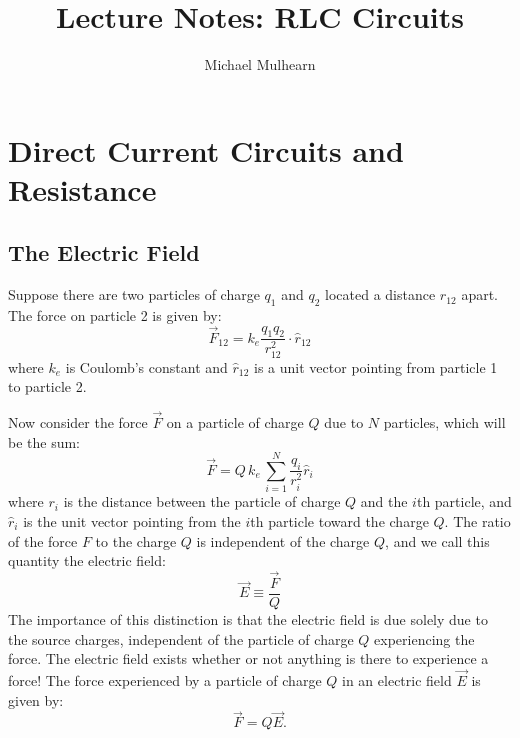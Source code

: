\documentclass[12pt,oneside]{book}
\begin{document}

\title{Lecture Notes:  RLC Circuits}
\author{Michael Mulhearn}

\maketitle

\chapter{Direct Current Circuits and Resistance}

\section{The Electric Field}

Suppose there are two particles of charge $q_1$ and $q_2$ located a distance $r_{12}$ apart.
The force on particle 2 is given by:
\begin{displaymath}
\vec{F}_{12} = k_e \frac{q_1 q_2}{r_{12}^2} \cdot \hat{r}_{12}
\end{displaymath}
where $k_e$ is Coulomb's constant and $\hat{r}_{12}$ is a unit vector pointing from particle 1 to particle 2.

Now consider the force $\vec{F}$ on a particle of charge $Q$ due to $N$ particles, which will be the sum:
\begin{displaymath}
\vec{F} = Q \, k_e \, \sum_{i=1}^N \frac{q_i}{r_{i}^2} \hat{r}_{i}
\end{displaymath}
where $r_i$ is the distance between the particle of charge $Q$ and the $i$th particle, and $\hat{r}_i$ is the unit vector pointing from the $i$th particle toward the charge $Q$.  The ratio of the force $F$ to the charge $Q$ is independent of the charge $Q$, and we call this quantity the electric field:
\begin{displaymath}
\vec{E} \equiv \frac{\vec{F}}{Q}
\end{displaymath}
The importance of this distinction is that the electric field is due solely due to the source charges, independent of the particle of charge $Q$ experiencing the force.  The electric field exists whether or not anything is there to experience a force!  The force experienced by a particle of charge $Q$ in an electric field $\vec{E}$ is given by:
\begin{displaymath}
\vec{F} = Q \vec{E}.
\end{displaymath}
\end{document}
